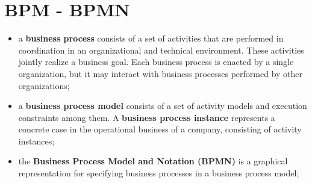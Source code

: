 \documentclass[oneside]{article}
\begin{document}
\section{BPM - BPMN}
\begin{itemize}
    \begin{figure}[!htb]
    \end{figure}
    \item a \textbf{business process} consists of a set of activities that are performed in coordination in an organizational and technical environment. These activities jointly realize a business goal. Each business process is enacted by a single organization, but it may interact with business processes performed by other organizations;
    
    \item a \textbf{business process model} consists of a set of activity models and execution constraints among them. A \textbf{business process instance} represents a concrete case in the operational business of a company, consisting of activity instances;
    
    \item the \textbf{Business Process Model and Notation (BPMN)} is a graphical representation for specifying business processes in a business process model;
    

\end{itemize}
\end{document}
